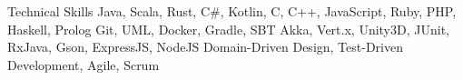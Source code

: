 
\begin{rubric}{Technical Skills}
	Java, Scala, Rust, C\#, Kotlin, C, C++, JavaScript, Ruby, PHP, Haskell, Prolog
	Git, UML, Docker, Gradle, SBT
	Akka, Vert.x, Unity3D, JUnit, RxJava, Gson, ExpressJS, NodeJS
	Domain-Driven Design, Test-Driven Development, Agile, Scrum
\end{rubric}
